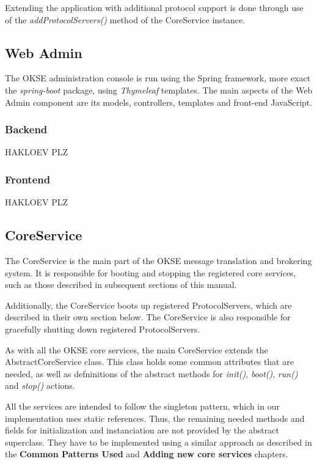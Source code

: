 Extending the application with additional protocol support is done through use of the \textit{addProtocolServers()} method of the CoreService instance.

\subsection{Web Admin}

The OKSE administration console is run using the Spring framework, more exact the \textit{spring-boot} package, using \textit{Thymeleaf} templates. The main aspects of the Web Admin component are its models, controllers, templates and front-end JavaScript.

\subsubsection{Backend}

HAKLOEV PLZ

\subsubsection{Frontend}

HAKLOEV PLZ

\subsection{CoreService}

The CoreService is the main part of the OKSE message translation and brokering system. It is responsible for booting and stopping the registered core services, such as those described in subsequent sections of this manual.

Additionally, the CoreService boots up registered ProtocolServers, which are described in their own section below. The CoreService is also responsible for gracefully shutting down registered ProtocolServers.

As with all the OKSE core services, the main CoreService extends the AbstractCoreService class. This class holds some common attributes that are needed, as well as defninitions of the abstract methods for \textit{init()}, \textit{boot()}, \textit{run()} and \textit{stop()} actions.

All the services are intended to follow the singleton pattern, which in our implementation uses static references. Thus, the remaining needed methods and fields for initialization and instanciation are not provided by the abstract superclass. They have to be implemented using a similar approach as described in the \textbf{Common Patterns Used} and \textbf{Adding new core services} chapters.

